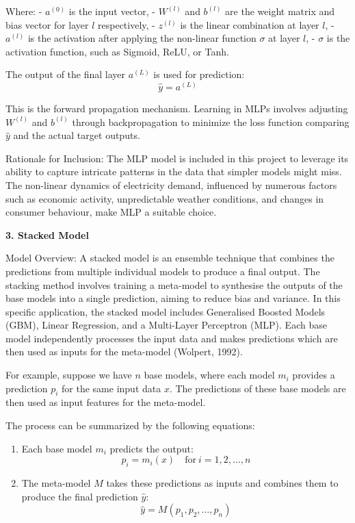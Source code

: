 \documentclass[
]{article}
\begin{document}
Where: - \(a^{(0)}\) is the input vector, - \(W^{(l)}\) and \(b^{(l)}\)
are the weight matrix and bias vector for layer \(l\) respectively, -
\(z^{(l)}\) is the linear combination at layer \(l\), - \(a^{(l)}\) is
the activation after applying the non-linear function \(\sigma\) at
layer \(l\), - \(\sigma\) is the activation function, such as Sigmoid,
ReLU, or Tanh.

The output of the final layer \(a^{(L)}\) is used for prediction:
\[ \hat{y} = a^{(L)} \]

This is the forward propagation mechanism. Learning in MLPs involves
adjusting \(W^{(l)}\) and \(b^{(l)}\) through backpropagation to
minimize the loss function comparing \(\hat{y}\) and the actual target
outputs.

Rationale for Inclusion: The MLP model is included in this project to
leverage its ability to capture intricate patterns in the data that
simpler models might miss. The non-linear dynamics of electricity
demand, influenced by numerous factors such as economic activity,
unpredictable weather conditions, and changes in consumer behaviour,
make MLP a suitable choice.

\textbf{3. Stacked Model}

Model Overview: A stacked model is an ensemble technique that combines
the predictions from multiple individual models to produce a final
output. The stacking method involves training a meta-model to synthesise
the outputs of the base models into a single prediction, aiming to
reduce bias and variance. In this specific application, the stacked
model includes Generalised Boosted Models (GBM), Linear Regression, and
a Multi-Layer Perceptron (MLP). Each base model independently processes
the input data and makes predictions which are then used as inputs for
the meta-model (Wolpert, 1992).

For example, suppose we have \(n\) base models, where each model \(m_i\)
provides a prediction \(p_i\) for the same input data \(x\). The
predictions of these base models are then used as input features for the
meta-model.

The process can be summarized by the following equations:

\begin{enumerate}
\def\labelenumi{\arabic{enumi}.}
\item
  Each base model \(m_i\) predicts the output:
  \[ p_i = m_i(x) \quad \text{for} \ i = 1, 2, \ldots, n \]
\item
  The meta-model \(M\) takes these predictions as inputs and combines
  them to produce the final prediction \(\hat{y}\):
  \[ \hat{y} = M(p_1, p_2, \ldots, p_n) \]
\end{enumerate}
\end{document}
